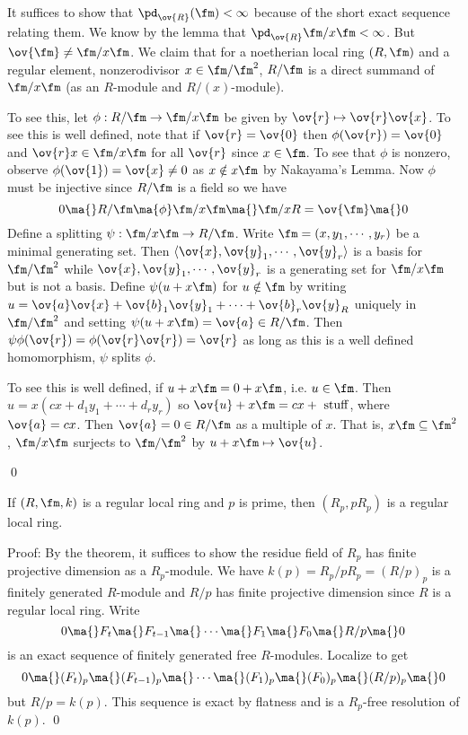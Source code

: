 \begin{enumerate}
It suffices to show that $\pd_{\ov{R}}(\fm)<\infty$ because of the short exact sequence relating them. We know by the lemma that $\pd_{\ov{R}} \fm/x \fm<\infty$. But $\ov{\fm} \neq \fm/x\fm$. We claim that for a noetherian local ring $(R,\fm)$ and a regular element, nonzerodivisor $x \in \fm/\fm^2$, $R/\fm$ is a direct summand of $\fm/x\fm$ (as an $R$-module and $R/(x)$-module). 

To see this, let $\phi: R/\fm \to \fm/x\fm$ be given by $\ov{r} \mapsto \ov{r} \ov{x}$. To see this is well defined, note that if $\ov{r}=\ov{0}$ then $\phi(\ov{r})=\ov{0}$ and $\ov{r} x \in \fm/x \fm$ for all $\ov{r}$ since $x \in \fm$. To see that $\phi$ is nonzero, observe $\phi(\ov{1})=\ov{x} \neq 0$ as $x \notin x \fm$ by Nakayama's Lemma. Now $\phi$ must be injective since $R/\fm$ is a field so we have
\[
0 \ma{} R/\fm \ma{\phi} \fm/x\fm \ma{} \fm/xR=\ov{\fm} \ma{} 0
\]
Define a splitting $\psi: \fm/x\fm \to R/\fm$. Write $\fm=(x,y_1,\cdots,y_r)$ be a minimal generating set. Then $\langle \ov{x},\ov{y}_1,\cdots,\ov{y}_r \rangle$ is a basis for $\fm/\fm^2$ while $\ov{x},\ov{y}_1,\cdots,\ov{y}_r$ is a generating set for $\fm/x\fm$ but is not a basis. Define $\psi(u+x\fm)$ for $u \notin \fm$ by writing $u=\ov{a} \ov{x}+\ov{b}_1 \ov{y}_1+\cdots+\ov{b}_r \ov{y}_R$ uniquely in $\fm/\fm^2$ and setting $\psi(u+x\fm)=\ov{a} \in R/\fm$. Then $\psi \phi(\ov{r})=\phi(\ov{r} \ov{r})=\ov{r}$ as long as this is a well defined homomorphism, $\psi$ splits $\phi$. 

To see this is well defined, if $u+x\fm=0+x\fm$, i.e. $u \in \fm$. Then $u=x(cx+d_1y_1+\cdots+d_ry_r)$ so $\ov{u}+x\fm=cx+\text{ stuff}$, where $\ov{a}=cx$. Then $\ov{a}=0 \in R/\fm$ as a multiple of $x$. That is, $x \fm \subseteq \fm^2$, $\fm/x\fm$ surjects to $\fm/\fm^2$ by $u+x\fm \mapsto \ov{u}$.
\end{enumerate}
\qed \\

\begin{cor}
If $(R,\fm,k)$ is a regular local ring and $p$ is prime, then $(R_p,pR_p)$ is a regular local ring. 
\end{cor}

\noindent Proof: By the theorem, it suffices to show the residue field of $R_p$ has finite projective dimension as a $R_p$-module. We have $k(p)=R_p/pR_p=(R/p)_p$ is a finitely generated $R$-module and $R/p$ has finite projective dimension since $R$ is a regular local ring. Write
\[
0 \ma{} F_t \ma{} F_{t-1} \ma{} \cdots \ma{} F_1 \ma{} F_0 \ma{} R/p \ma{} 0
\]
is an exact sequence of finitely generated free $R$-modules. Localize to get
\[
0 \ma{} (F_t)_p \ma{} (F_{t-1})_p \ma{} \cdots \ma{} (F_1)_p \ma{} (F_0)_p \ma{} (R/p)_p \ma{} 0
\]
but $R/p=k(p)$. This sequence is exact by flatness and is a $R_p$-free resolution of $k(p)$. \qed \\

